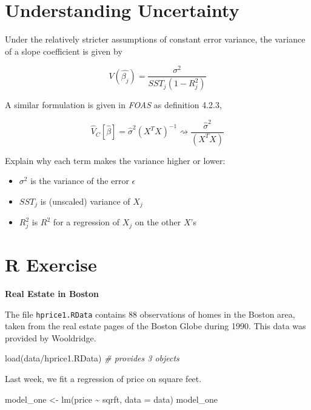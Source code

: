 \documentclass[
]{book}
\newenvironment{Shaded}{\begin{snugshade}}{\end{snugshade}}
\newcommand{\AttributeTok}[1]{\textcolor[rgb]{0.77,0.63,0.00}{#1}}
\newcommand{\CommentTok}[1]{\textcolor[rgb]{0.56,0.35,0.01}{\textit{#1}}}
\newcommand{\FunctionTok}[1]{\textcolor[rgb]{0.00,0.00,0.00}{#1}}
\newcommand{\NormalTok}[1]{#1}
\newcommand{\OtherTok}[1]{\textcolor[rgb]{0.56,0.35,0.01}{#1}}
\newcommand{\SpecialCharTok}[1]{\textcolor[rgb]{0.00,0.00,0.00}{#1}}
\newcommand{\StringTok}[1]{\textcolor[rgb]{0.31,0.60,0.02}{#1}}
\providecommand{\tightlist}{%
  \setlength{\itemsep}{0pt}\setlength{\parskip}{0pt}}
\theoremstyle{definition}
\theoremstyle{definition}
\theoremstyle{definition}
\theoremstyle{definition}
\theoremstyle{remark}
\begin{document}
\hypertarget{understanding-uncertainty-1}{%
\section{Understanding Uncertainty}\label{understanding-uncertainty-1}}

Under the relatively stricter assumptions of constant error variance, the variance of a slope coefficient is given by

\[
  V(\hat{\beta_j}) = \frac{\sigma^2}{SST_j (1-R_j^2)}
\]

A similar formulation is given in \emph{FOAS} as definition 4.2.3,

\[
  \hat{V}_{C}[\hat{\beta}] = \hat{\sigma}^2 \left( X^{T} X \right)^{-1} \rightsquigarrow \frac{\hat{\sigma}^{2}}{\left( X^{T}X\right)}
\]

Explain why each term makes the variance higher or lower:

\begin{itemize}
\tightlist
\item
  \(\sigma^2\) is the variance of the error \(\epsilon\)
\item
  \(SST_j\) is (unscaled) variance of \(X_j\)
\item
  \(R_j^2\) is \(R^2\) for a regression of \(X_j\) on the other \(X\)'s
\end{itemize}

\hypertarget{r-exercise-1}{%
\section{R Exercise}\label{r-exercise-1}}

\textbf{Real Estate in Boston}

The file \texttt{hprice1.RData} contains 88 observations of homes in the Boston area, taken from the real estate pages of the Boston Globe during 1990. This data was provided by Wooldridge.

\begin{Shaded}
\begin{Highlighting}[]
\FunctionTok{load}\NormalTok{(}\StringTok{\textquotesingle{}data/hprice1.RData\textquotesingle{}}\NormalTok{) }\CommentTok{\# provides 3 objects }
\end{Highlighting}
\end{Shaded}

Last week, we fit a regression of price on square feet.

\begin{Shaded}
\begin{Highlighting}[]
\NormalTok{model\_one }\OtherTok{\textless{}{-}} \FunctionTok{lm}\NormalTok{(price }\SpecialCharTok{\textasciitilde{}}\NormalTok{ sqrft, }\AttributeTok{data =}\NormalTok{ data)}
\NormalTok{model\_one}
\end{Highlighting}
\end{Shaded}
\end{document}
